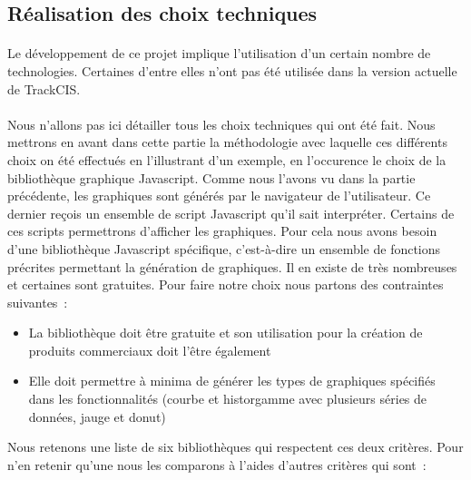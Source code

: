 		\subsection{Réalisation des choix techniques}
			\paragraph{}%
			Le développement de ce projet implique l'utilisation d'un certain nombre de
			technologies. Certaines d'entre elles n'ont pas été utilisée dans la version
			actuelle de TrackCIS.
			
			\paragraph{}%
			Nous n'allons pas ici détailler tous les choix techniques qui ont été fait.
			Nous mettrons en avant dans cette partie la méthodologie avec laquelle ces
			différents choix on été effectués en l'illustrant d'un exemple, en
			l'occurence le choix de la bibliothèque graphique Javascript. Comme nous
			l'avons vu dans la partie précédente, les graphiques sont
			générés par le navigateur de l'utilisateur. Ce dernier reçois un ensemble
			de script Javascript qu'il sait interpréter. Certains de ces scripts
			permettrons d'afficher les graphiques. Pour cela nous avons besoin d'une
			bibliothèque Javascript spécifique, c'est-à-dire un ensemble de fonctions
			précrites permettant la génération de graphiques.
			Il en existe de très nombreuses et certaines sont gratuites. Pour
			faire notre choix nous partons des contraintes suivantes~:
			\begin{itemize}
			  \item La bibliothèque doit être gratuite et son utilisation pour la
			  création de produits commerciaux doit l'être également
			  \item Elle doit permettre à minima de générer les types de graphiques
			  spécifiés dans les fonctionnalités (courbe et historgamme avec plusieurs
			  séries de données, jauge et donut)
			\end{itemize}
			Nous retenons une liste de six bibliothèques qui respectent ces deux
			critères.
			Pour n'en retenir qu'une nous les comparons à l'aides d'autres critères qui
			sont~:
